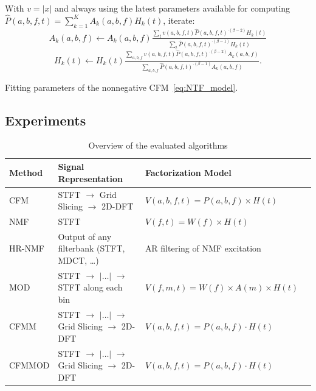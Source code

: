 \begin{algorithm}
With $v=\left|x\right|$ and always using the latest
parameters available for computing
 $\hat{P}\left(a,b,f,t\right)=\sum\limits_{k=1}^{K}A_{k}\left(a,b,f\right)H_{k}\left(t\right)$,
iterate:
\[
A_{k}\left(a,b,f\right)\leftarrow A_{k}\left(a,b,f\right)\tfrac{\sum_{t}v\left(a,b,f,t\right)\hat{P}\left(a,b,f,t\right)^{\cdot\left(\beta-2\right)}H_{k}\left(t\right)}{\sum_{t}\hat{P}\left(a,b,f,t\right)^{\cdot\left(\beta-1\right)}H_{k}\left(t\right)}
\]
\[
H_{k}\left(t\right)\leftarrow H_{k}\left(t\right)\tfrac{\sum_{a,b,f}v\left(a,b,f,t\right)\hat{P}\left(a,b,f,t\right)^{\cdot\left(\beta-2\right)}A_{k}\left(a,b,f\right)}{\sum_{a,b,f}\hat{P}\left(a,b,f,t\right)^{\cdot\left(\beta-1\right)}A_{k}\left(a,b,f\right)}.
\]

\caption{Fitting parameters of the nonnegative CFM~\eqref{eq:NTF_model}.\label{alg:Fitting-NTF}}
\end{algorithm}

\subsection{Experiments}
\label{sec:experiment}

\begin{table}[ht!]
  \centering
  \scriptsize
\begin{tabular}{ llll }
    \toprule
    Method & Signal Representation & Factorization Model \\
    \midrule
    CFM~\cite{stoter16} & STFT $\rightarrow$ Grid Slicing $\rightarrow$ 2D-DFT & $V(a,b,f,t) = P(a,b,f)\times H(t)$ \\
    NMF~\cite{virtanen07} & STFT & $V(f,t) = W(f)\times H(t)$ \\
    HR-NMF~\cite{badeau13} & Output of any filterbank (STFT, MDCT, \ldots)  & AR filtering of NMF excitation \\
    MOD~\cite{barker13} & STFT $\rightarrow$ $|\ldots|$ $\rightarrow$ STFT along each bin & $V(f,m,t) = W(f)\times A(m)\times H(t)$ \\
    CFMM & STFT $\rightarrow$ $|\ldots|$ $\rightarrow$ Grid Slicing $\rightarrow$ 2D-DFT & $V(a,b,f,t) = P(a,b,f)\cdot H(t)$ \\
    CFMMOD & STFT $\rightarrow$ $|\ldots|$ $\rightarrow$ Grid Slicing $\rightarrow$ 2D-DFT & $V(a,b,f,t) = P(a,b,f)\cdot H(t)$ \\
    \bottomrule
\end{tabular}
\caption{Overview of the evaluated algorithms}
\label{tab:methods}
\end{table}

